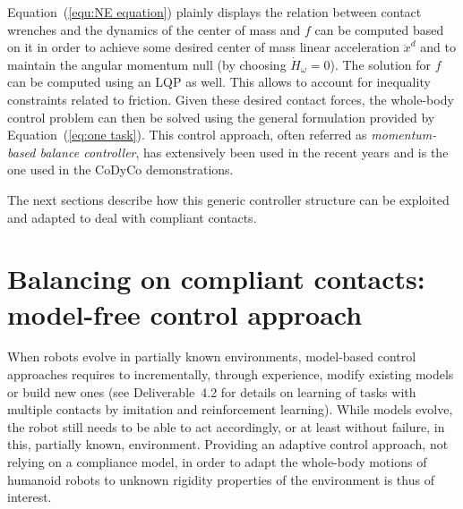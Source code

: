 \documentclass[12pt,a4paper,twoside]{article}
\begin{document}
Equation~(\ref{equ:NE equation}) plainly displays the relation between contact wrenches and the dynamics of the center of mass and $f$ can be computed based on it in order to achieve some desired center of mass linear acceleration $\ddot{x}^d$ and to maintain the angular momentum null (by choosing $\dot{H}_{\omega} = 0$). The solution for $f$ can be computed using an LQP as well. This allows to account for inequality constraints related to friction. Given these desired contact forces, the whole-body control problem can then be solved using the general formulation provided by Equation~(\ref{eq:one task}). This control approach, often referred as \textit{momentum-based balance controller}, has extensively been used in the recent years \cite{Lee&Goswami12,perrin_ISRR2015,Herzog2015} and is the one used in the CoDyCo demonstrations.

The next sections describe how this generic controller structure can be exploited and adapted to deal with compliant contacts.

\section{Balancing on compliant contacts: model-free control approach}

When robots evolve in partially known environments, model-based control approaches requires to incrementally, through experience, modify existing models or build new ones (see Deliverable~4.2 \cite{deliverable42} for details on learning of tasks with multiple contacts by imitation and reinforcement learning). While models evolve, the robot still needs to be able to act accordingly, or at least without failure, in this, partially known, environment. Providing an adaptive control approach, not relying on a compliance model, in order to adapt the whole-body motions of humanoid robots to unknown rigidity properties of the environment is thus of interest.
\end{document}
